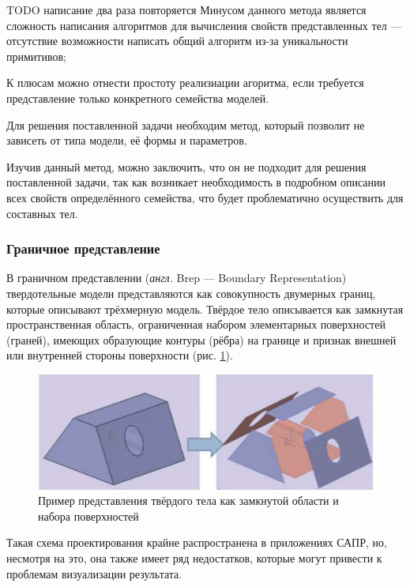 TODO написание два раза повторяется Минусом данного метода является сложность написания алгоритмов для вычисления свойств представленных тел --- отсутствие возможности написать общий алгоритм из-за уникальности примитивов;

К плюсам можно отнести простоту реализиации агоритма, если требуется представление только конкретного семейства моделей. 

Для решения поставленной задачи необходим метод, который позволит 
не зависеть от типа модели, её формы и параметров.  

Изучив данный метод, можно заключить, что он не подходит для решения 
поставленной задачи, так как возникает необходимость в подробном описании 
всех свойств определённого семейства, что будет проблематично осуществить 
для составных тел.

\subsubsection{Граничное представление}
В граничном представлении (\textit{англ.} Brep --- Boundary Representation) \cite{brep} твердотельные модели представляются как совокупность 
двумерных границ, которые описывают трёхмерную модель. 
Твёрдое тело описывается как замкнутая пространственная область, ограниченная набором элементарных поверхностей (граней), имеющих образующие контуры (рёбра) на границе и признак внешней или внутренней стороны поверхности (рис. \ref{fig:brep}). \newpage

\begin{figure}[h]
	\centering
	\captionsetup{justification=centering}
	\includegraphics[width=\textwidth]{img/brep.png}
	\caption{Пример представления твёрдого тела как замкнутой области и набора поверхностей}
	\label{fig:brep}
\end{figure}

Такая схема проектирования крайне распространена в приложениях 
САПР, но, несмотря на это, она также имеет ряд недостатков, которые могут 
привести к проблемам визуализации результата.

